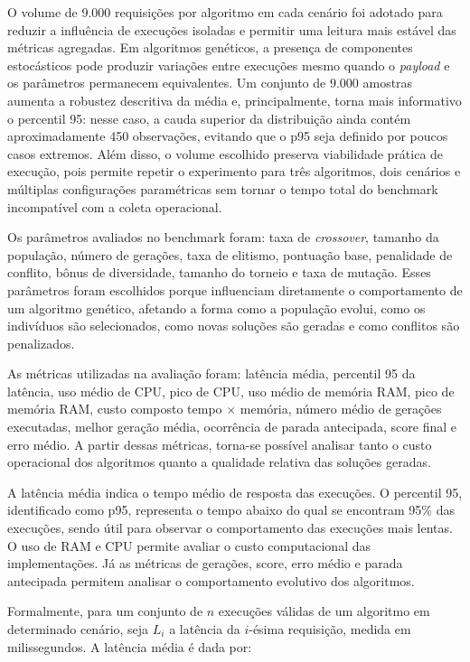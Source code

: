 O volume de 9.000 requisições por algoritmo em cada cenário foi adotado para reduzir a influência de execuções isoladas e permitir uma leitura mais estável das métricas agregadas. Em algoritmos genéticos, a presença de componentes estocásticos pode produzir variações entre execuções mesmo quando o \textit{payload} e os parâmetros permanecem equivalentes. Um conjunto de 9.000 amostras aumenta a robustez descritiva da média e, principalmente, torna mais informativo o percentil 95: nesse caso, a cauda superior da distribuição ainda contém aproximadamente 450 observações, evitando que o p95 seja definido por poucos casos extremos. Além disso, o volume escolhido preserva viabilidade prática de execução, pois permite repetir o experimento para três algoritmos, dois cenários e múltiplas configurações paramétricas sem tornar o tempo total do benchmark incompatível com a coleta operacional.

Os parâmetros avaliados no benchmark foram: taxa de \textit{crossover}, tamanho da população, número de gerações, taxa de elitismo, pontuação base, penalidade de conflito, bônus de diversidade, tamanho do torneio e taxa de mutação. Esses parâmetros foram escolhidos porque influenciam diretamente o comportamento de um algoritmo genético, afetando a forma como a população evolui, como os indivíduos são selecionados, como novas soluções são geradas e como conflitos são penalizados.

As métricas utilizadas na avaliação foram: latência média, percentil 95 da latência, uso médio de CPU, pico de CPU, uso médio de memória RAM, pico de memória RAM, custo composto tempo \(\times\) memória, número médio de gerações executadas, melhor geração média, ocorrência de parada antecipada, score final e erro médio. A partir dessas métricas, torna-se possível analisar tanto o custo operacional dos algoritmos quanto a qualidade relativa das soluções geradas.

A latência média indica o tempo médio de resposta das execuções. O percentil 95, identificado como p95, representa o tempo abaixo do qual se encontram 95\% das execuções, sendo útil para observar o comportamento das execuções mais lentas. O uso de RAM e CPU permite avaliar o custo computacional das implementações. Já as métricas de gerações, score, erro médio e parada antecipada permitem analisar o comportamento evolutivo dos algoritmos.

Formalmente, para um conjunto de \(n\) execuções válidas de um algoritmo em determinado cenário, seja \(L_i\) a latência da \(i\)-ésima requisição, medida em milissegundos. A latência média é dada por:

